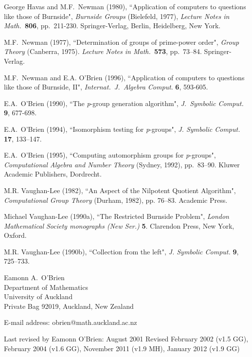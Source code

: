 \documentclass[12pt]{article}
\begin{document}
\begin{description}
\item George Havas and M.F.\ Newman (1980), ``Application of computers to
questions like those of Burnside", {\it Burnside Groups} (Bielefeld, 1977),
{\it Lecture Notes in Math.\ }{\bf 806}, pp.\ 211-230.
Springer-Verlag, Berlin, Heidelberg, New York.

\item M.F.\ Newman (1977), ``Determination of groups of prime-power order", 
{\it Group Theory} (Canberra, 1975). {\it Lecture Notes in Math.\ }{\bf 573},
pp.\ 73--84. 
Springer-Verlag.

\item M.F.\ Newman and E.A. O'Brien (1996),
``Application of computers to questions like those of Burnside, {II}",
{\it Internat.\ J.\ Algebra Comput}. {\bf 6}, 593-605.
 
\item E.A.\ O'Brien (1990), ``The {\it p}-group generation
algorithm", {\it J.\ Symbolic Comput.} {\bf 9}, 677-698.

\item E.A.\ O'Brien (1994), ``Isomorphism testing
for \mbox{{\it p}-groups}", {\it J. Symbolic Comput.} {\bf 17},
133--147.

\item E.A.\ O'Brien (1995), ``Computing automorphism groups for
{\it p}-groups",  {\it Computational Algebra and Number Theory}
(Sydney, 1992), pp.\ 83--90. Kluwer Academic Publishers, Dordrecht.

\item M.R. Vaughan-Lee (1982), ``An Aspect of the Nilpotent 
Quotient Algorithm", {\it Computational Group Theory}
(Durham, 1982), pp. 76--83. Academic Press.

\item Michael Vaughan-Lee (1990a), ``The Restricted Burnside Problem",
{\it London Mathematical Society monographs (New Ser.)} {\bf 5}.
Clarendon Press, New York, Oxford.

\item M.R. Vaughan-Lee (1990b), ``Collection from the left", 
{\it J. Symbolic Comput.} {\bf 9}, 725--733.

\end{description}

\noindent 
Eamonn A.\ O'Brien \\
Department of Mathematics \\
University of Auckland  \\
Private Bag 92019, Auckland, New Zealand

\vspace*{0.25cm}
\noindent 
E-mail address: obrien@math.auckland.ac.nz

\vspace*{0.35cm}
\noindent 
Last revised by Eamonn O'Brien: August 2001\hfil\break\noindent
Revised February 2002 (v1.5 GG), February 2004 (v1.6 GG),\hfil\break
\hspace*{2em}November 2011 (v1.9 MH), January 2012 (v1.9 GG)
\end{document}
